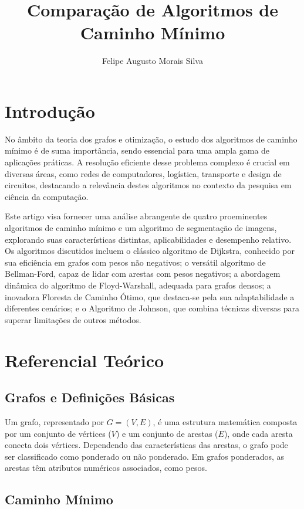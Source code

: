\documentclass[12pt]{article}
\title{Comparação de Algoritmos de Caminho Mínimo}
\author{Felipe Augusto Morais Silva}
\begin{document}
 

\maketitle

\section{Introdução}

No âmbito da teoria dos grafos e otimização, o estudo dos algoritmos de caminho mínimo é de suma importância, sendo essencial para uma ampla gama de aplicações práticas. A resolução eficiente desse problema complexo é crucial em diversas áreas, como redes de computadores, logística, transporte e design de circuitos, destacando a relevância destes algoritmos no contexto da pesquisa em ciência da computação.

Este artigo visa fornecer uma análise abrangente de quatro proeminentes algoritmos de caminho mínimo e um algoritmo de segmentação de imagens, explorando suas características distintas, aplicabilidades e desempenho relativo. Os algoritmos discutidos incluem o clássico algoritmo de Dijkstra, conhecido por sua eficiência em grafos com pesos não negativos; o versátil algoritmo de Bellman-Ford, capaz de lidar com arestas com pesos negativos; a abordagem dinâmica do algoritmo de Floyd-Warshall, adequada para grafos densos; a inovadora Floresta de Caminho Ótimo, que destaca-se pela sua adaptabilidade a diferentes cenários; e o Algoritmo de Johnson, que combina técnicas diversas para superar limitações de outros métodos.

\section{Referencial Teórico}

\subsection{Grafos e Definições Básicas}

Um grafo, representado por \( G = (V, E) \), é uma estrutura matemática composta por um conjunto de vértices (\( V \)) e um conjunto de arestas (\( E \)), onde cada aresta conecta dois vértices. Dependendo das características das arestas, o grafo pode ser classificado como ponderado ou não ponderado. Em grafos ponderados, as arestas têm atributos numéricos associados, como pesos.

\subsection{Caminho Mínimo}
\end{document}
